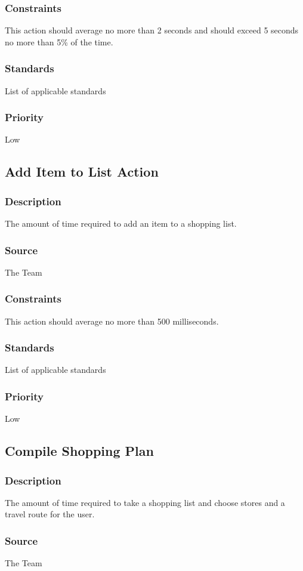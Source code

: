 \subsubsection{Constraints}
This action should average no more than 2 seconds and should exceed 5 seconds no more than 5\% of the time.
\subsubsection{Standards}
List of applicable standards
\subsubsection{Priority}
Low

\subsection{Add Item to List Action}
\subsubsection{Description}
The amount of time required to add an item to a shopping list.
\subsubsection{Source}
The Team
\subsubsection{Constraints}
This action should average no more than 500 milliseconds.
\subsubsection{Standards}
List of applicable standards
\subsubsection{Priority}
Low

\subsection{Compile Shopping Plan}
\subsubsection{Description}
The amount of time required to take a shopping list and choose stores and a travel route for the user.
\subsubsection{Source}
The Team
